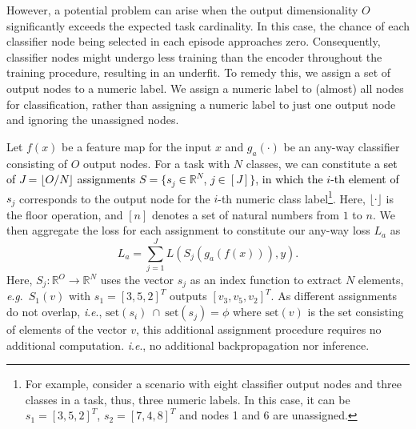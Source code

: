 \documentclass[letterpaper]{article} %
\newcommand{\nj}[1]{\textcolor{black}{#1}}
\newcommand{\yr}[1]{\textcolor{black}{#1}}
\newcommand{\ie}{\textit{i}.\textit{e}., }
\newcommand{\eg}{\textit{e}.\textit{g}.\ }
\begin{document}
However, a potential problem can arise when the output dimensionality $O$ significantly exceeds the expected task cardinality. In this case, the chance of each classifier node being selected %
in each episode approaches zero. Consequently, classifier nodes might undergo less training than the encoder throughout the training procedure, resulting in an underfit.
To remedy this, we assign a set of output nodes to a numeric label. We assign a numeric label to (almost) all nodes for classification, rather than assigning a numeric label to just one output node and ignoring the unassigned nodes.

Let $f(x)$ be a feature map for the input $x$ and $g_a(\cdot)$ be an any-way classifier consisting of $O$ output nodes. For a task with $N$ classes, we can constitute \nj{a set of $J = \lfloor O/N \rfloor$ assignments $S = \{s_j \in \mathbb{R}^N$, $j \in [J]\}$, in which the $i$-th element of $s_j$} corresponds to the output node for the $i$-th numeric class label\footnote{For example, consider a scenario with eight classifier output nodes and three classes in a task, thus, three numeric labels. In this case, it can be $s_1 = [3,5,2]^T$, $s_2 = [7,4,8]^T$ and nodes 1 and 6 are unassigned. }.  Here, $\lfloor \cdot \rfloor$ is the floor operation, and $[n]$ denotes a set of natural numbers from $1$ to $n$. We then aggregate the loss for each assignment to constitute our any-way loss $L_a$ as
\begin{equation}
L_{a} = \sum_{j=1}^J L(S_j(g_a(f(x))),y).
\label{eq:any-way-loss}
\end{equation}
Here, $S_j: \mathbb{R}^O \rightarrow \mathbb{R}^N$ uses the vector $s_j$ as an index function to extract $N$ elements, \eg $S_1(v)$ with $s_1 = [3,5,2]^T$ outputs $[v_3, v_5, v_2]^T$.    As different assignments do not overlap, \ie $\text{set}(s_i) \ \cap \ \text{set}(s_j) = \phi$ where $\text{set}(v)$ is the set consisting of elements of the  vector $v$, this additional assignment procedure %
requires no additional computation. \ie no additional backpropagation nor inference.  
\end{document}
